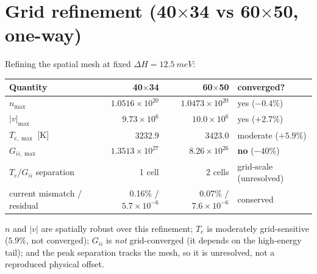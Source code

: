 \documentclass[11pt]{article}
\begin{document}
\section{Grid refinement (40$\times$34 vs 60$\times$50, one-way)}\label{sec:grid}
Refining the spatial mesh at fixed $\Delta H=\SI{12.5}{meV}$:
\begin{center}\small
\begin{tabular}{lrrl}
\toprule
Quantity & 40$\times$34 & 60$\times$50 & converged? \\
\midrule
$n_{\max}$ & $1.0516\times10^{20}$ & $1.0473\times10^{20}$ & yes ($-0.4\%$) \\
$|v|_{\max}$ & $9.73\times10^{6}$ & $10.0\times10^{6}$ & yes ($+2.7\%$) \\
$T_{e,\max}$ [K] & $3232.9$ & $3423.0$ & moderate ($+5.9\%$) \\
$G_{ii,\max}$ & $1.3513\times10^{27}$ & $8.26\times10^{26}$ & \textbf{no} ($-40\%$) \\
$T_e$/$G_{ii}$ separation & 1 cell & 2 cells & grid-scale (unresolved) \\
current mismatch / residual & 0.16\% / $5.7\!\times\!10^{-6}$ & 0.07\% / $7.6\!\times\!10^{-6}$ & conserved \\
\bottomrule
\end{tabular}
\end{center}
$n$ and $|v|$ are spatially robust over this refinement; $T_e$ is moderately grid-sensitive
($5.9\%$, not converged); $G_{ii}$ is \emph{not} grid-converged (it
depends on the high-energy tail); and the peak separation tracks the mesh, so it is unresolved,
not a reproduced physical offset.
\end{document}
